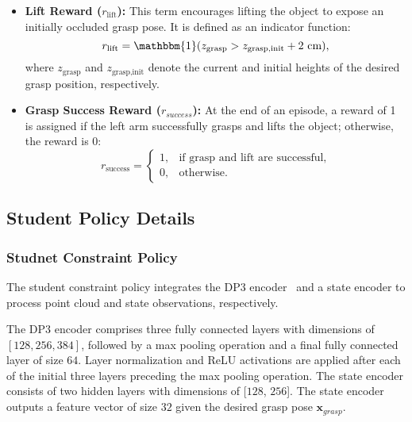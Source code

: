 \begin{itemize}
    \item \textbf{Lift Reward ($r_{\text{lift}}$):} This term encourages lifting the object to expose an initially occluded grasp pose. It is defined as an indicator function:
    \begin{equation}
        r_{\text{lift}} = \mathbbm{1}(z_{\text{grasp}} > z_{\text{grasp,init}} + 2 \text{ cm}),
    \end{equation}
    where $z_{\text{grasp}}$ and $z_{\text{grasp,init}}$ denote the current and initial heights of the desired grasp position, respectively.

    \item \textbf{Grasp Success Reward ($r_{success}$):} At the end of an episode, a reward of 1 is assigned if the left arm successfully grasps and lifts the object; otherwise, the reward is 0:
    \begin{equation}
        r_{\text{success}} =
        \begin{cases}
            1, & \text{if grasp and lift are successful}, \\
            0, & \text{otherwise}.
        \end{cases}
    \end{equation}
\end{itemize}


    
    



\subsection{Student Policy Details}
\label{appendix:student}

\subsubsection{Studnet Constraint Policy}
The student constraint policy integrates the DP3 encoder~\cite{ze20243d} and a state encoder to process point cloud and state observations, respectively. 

The DP3 encoder comprises three fully connected layers with dimensions of $[128, 256, 384]$, followed by a max pooling operation and a final fully connected layer of size $64$. 
Layer normalization and ReLU activations are applied after each of the initial three layers preceding the max pooling operation.
The state encoder consists of two hidden layers with dimensions of [$128$, $256$]. The state encoder outputs a feature vector of size $32$ given the desired grasp pose $\mathbf{x}_{grasp}$.

